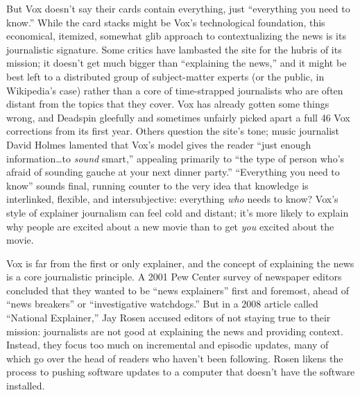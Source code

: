 But Vox doesn't say their cards contain everything, just ``everything you need to know.'' While the card stacks might be Vox's technological foundation, this economical, itemized, somewhat glib approach to contextualizing the news is its journalistic signature. Some critics have lambasted the site for the hubris of its mission; it doesn't get much bigger than ``explaining the news,'' and it might be best left to a distributed group of subject-matter experts (or the public, in Wikipedia's case) rather than a core of time-strapped journalists who are often distant from the topics that they cover. Vox has already gotten some things wrong, and Deadspin gleefully and sometimes unfairly picked apart a full 46 Vox corrections from its first year.\autocite{draper_46_2014} Others question the site's tone; music journalist David Holmes lamented that Vox's model gives the reader ``just enough information\ldots to \emph{sound} smart,'' appealing primarily to ``the type of person who's afraid of sounding gauche at your next dinner party.''\autocite{holmes_how_2015} ``Everything you need to know'' sounds final, running counter to the very idea that knowledge is interlinked, flexible, and intersubjective: everything \emph{who} needs to know? Vox's style of explainer journalism can feel cold and distant; it's more likely to explain why people are excited about a new movie than to get \emph{you} excited about the movie.

Vox is far from the first or only explainer, and the concept of explaining the news is a core journalistic principle. A 2001 Pew Center survey of newspaper editors concluded that they wanted to be ``news explainers'' first and foremost, ahead of ``news breakers'' or ``investigative watchdogs.''\autocite{pew_research_center_journalism_2001} But in a 2008 article called ``National Explainer,'' Jay Rosen accused editors of not staying true to their mission: journalists are not good at explaining the news and providing context.\autocite{rosen_national_2008} Instead, they focus too much on incremental and episodic updates, many of which go over the head of readers who haven't been following. Rosen likens the process to pushing software updates to a computer that doesn't have the software installed.

